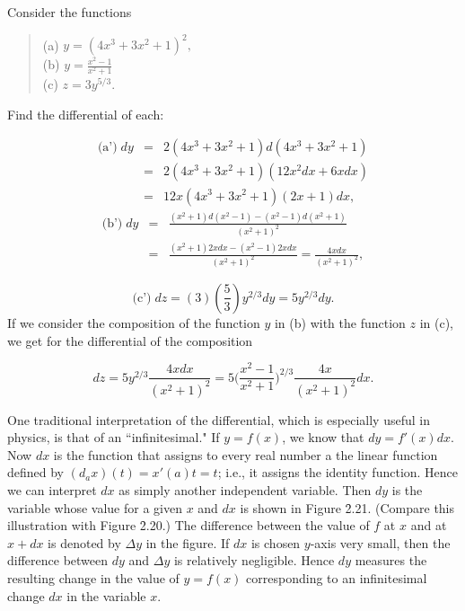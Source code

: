 \begin{example} 
Consider the functions 

\begin{quote}
\begin{description}
\item [(a) $y = (4x^3 + 3x^2 + 1)^2,$]
\item [(b) $y = \frac{x^2 -1}{x^2 + 1}$]
\item [(c) $z = 3y^{5/3}.$]
\end{description}
\end{quote}
\noindent Find the differential of each:

\begin{eqnarray*}
\mbox{(a')}\; dy &=& 2(4x^3 + 3x^2 + 1) d(4x^3 + 3x^2 + 1) \\
           &=& 2(4x^3 + 3x^2 + 1)(12x^2 dx + 6x dx) \\
           &=& 12x(4x^3 + 3x^2 + 1)(2x + 1) dx,
\end{eqnarray*}
\begin{eqnarray*}
\mbox{(b')}\; dy &=& \frac{(x^2 + 1 ) d(x^2 - 1 ) - (x^2 - 1 ) d(x^2 + 1 )}{(x^2 + 1 )^2}\\
           &=& \frac{(x^2 + 1)2xdx - (x^2 - 1)2xdx}{(x^2 + 1)^2} = \frac{4x dx}{(x^2 + 1)^2},
\end{eqnarray*}

$$
\mbox{(c')}\; dz = (3)(\frac{5}{3})y^{2/3}dy= 5y^{2/3}dy.
$$
\noindent If we consider the composition of the function $y$ in (b) with the function $z$ in (c), we get for the differential of the composition

$$
dz = 5y^{2/3} \frac{4x dx}{(x^2 + 1)^2} = 5 \biggl(\frac{x^2 - 1}{x^2 + 1} \biggr)^{2/3} \frac{4x}{(x^2 + 1)^2} dx. 
$$
\end{example}

One traditional interpretation of the differential, which is especially useful in physics, is that of an ``infinitesimal." If $y = f(x)$, we know that $dy = f'(x) dx$. Now $dx$ is the function that assigns to every real number a the linear function defined by $(d_{a}x)(t) = x'(a)t = t$; i.e., it assigns the identity function. Hence we can interpret $dx$ as simply another independent variable. Then $dy$ is the variable whose value for a given $x$ and $dx$ is shown in Figure \f{2.21}. (Compare this illustration with Figure \f{2.20}.) The difference between the value of $f$ at $x$ and at $x + dx$ is denoted by $\Delta y$ in the figure. If $dx$ is chosen $y$-axis very small, then the difference between $dy$ and $\Delta y$ is relatively negligible. Hence $dy$ measures the resulting change in the value of $y = f(x)$ corresponding to an infinitesimal change $dx$ in the variable $x$.

